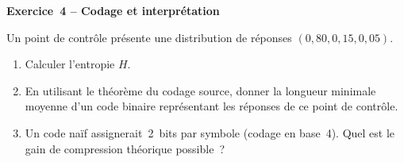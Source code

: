 \begin{boxexo}
\textbf{Exercice~4 – Codage et interprétation}

Un point de contrôle présente une distribution de réponses $(0{,}80, 0{,}15, 0{,}05)$.

\begin{enumerate}[label=(\alph*)]
  \item Calculer l'entropie $H$.
  \item En utilisant le théorème du codage source, donner la longueur minimale
        moyenne d'un code binaire représentant les réponses de ce point de
        contrôle.
  \item Un code naïf assignerait~2~bits par symbole (codage en base~4). Quel
        est le gain de compression théorique possible~?
\end{enumerate}
\end{boxexo}

